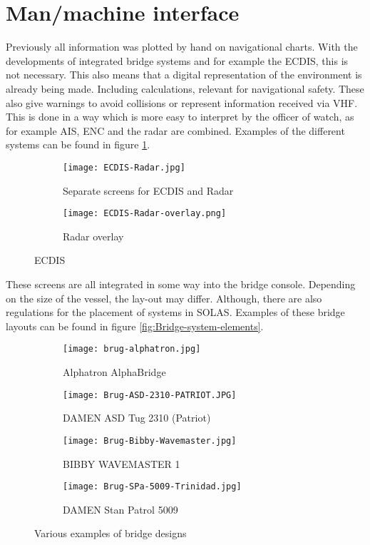 \section{Man/machine interface}

Previously all information was plotted by hand on navigational charts. With the developments of integrated bridge systems and for example the \ac{ECDIS}, this is not necessary. This also means that a digital representation of the environment is already being made. Including calculations, relevant for navigational safety. These also give warnings to avoid collisions or represent information received via \ac{VHF}. This is done in a way which is more easy to interpret by the officer of watch, as for example \ac{AIS}, \ac{ENC} and the radar are combined. Examples of the different systems can be found in figure \ref{fig:ECDIS-example}.

\begin{figure}[p]
	\centering
	
	\begin{subfigure}[b]{0.6\textwidth}
		\texttt{[image: ECDIS-Radar.jpg]}
		\caption{Separate screens for ECDIS and Radar}
	\end{subfigure}
	\hfill
	\begin{subfigure}[b]{0.37\textwidth}
		\texttt{[image: ECDIS-Radar-overlay.png]}
		\caption{Radar overlay}
	\end{subfigure}
	
	\caption{\acf{ECDIS}}
	\label{fig:ECDIS-example}
	
\end{figure}

These screens are all integrated in some way into the bridge console. Depending on the size of the vessel, the lay-out may differ. Although, there are also regulations for the placement of systems in \ac{SOLAS}. Examples of these bridge layouts can be found in figure \ref{fig:Bridge-system-elements}.

\begin{figure}[p]
	\centering
	
	\begin{subfigure}[b]{0.45\textwidth}
		\texttt{[image: brug-alphatron.jpg]}
		\caption{Alphatron AlphaBridge}
	\end{subfigure}
	\hfill
	\begin{subfigure}[b]{0.45\textwidth}
		\texttt{[image: Brug-ASD-2310-PATRIOT.JPG]}
		\caption{DAMEN ASD Tug 2310 (Patriot)}
	\end{subfigure}
	\hfill
	\begin{subfigure}[b]{0.45\textwidth}
		\texttt{[image: Brug-Bibby-Wavemaster.jpg]}
		\caption{BIBBY WAVEMASTER 1}
	\end{subfigure}
	\hfill
	\begin{subfigure}[b]{0.45\textwidth}
		\texttt{[image: Brug-SPa-5009-Trinidad.jpg]}
		\caption{DAMEN Stan Patrol 5009}
	\end{subfigure}	
	
	\caption{Various examples of bridge designs}
	\label{fig:bridge-example}
	
\end{figure}

